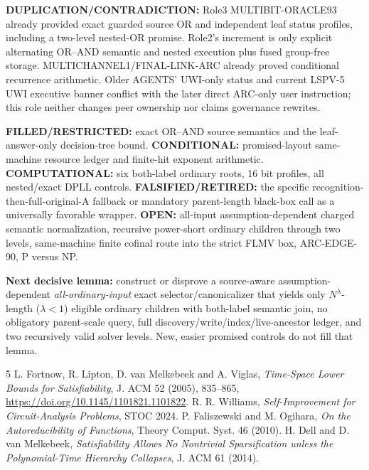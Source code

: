 \documentclass[11pt]{article}
\begin{document}
\textbf{DUPLICATION/CONTRADICTION:} Role3 MULTIBIT-ORACLE93 already provided exact guarded source OR and independent leaf status profiles, including a two-level nested-OR promise. Role2's increment is only explicit alternating OR--AND semantic and nested execution plus fused group-free storage. MULTICHANNEL1/FINAL-LINK-ARC already proved conditional recurrence arithmetic. Older AGENTS' UWI-only status and current LSPV-5 UWI executive banner conflict with the later direct ARC-only user instruction; this role neither changes peer ownership nor claims governance rewrites.

\textbf{FILLED/RESTRICTED:} exact OR--AND source semantics and the leaf-answer-only decision-tree bound. \textbf{CONDITIONAL:} promised-layout same-machine resource ledger and finite-hit exponent arithmetic. \textbf{COMPUTATIONAL:} six both-label ordinary roots, 16 bit profiles, all nested/exact DPLL controls. \textbf{FALSIFIED/RETIRED:} the specific recognition-then-full-original-A fallback or mandatory parent-length black-box call as a universally favorable wrapper. \textbf{OPEN:} all-input assumption-dependent charged semantic normalization, recursive power-short ordinary children through two levels, same-machine finite cofinal route into the strict FLMV box, ARC-EDGE-90, P versus NP.

\textbf{Next decisive lemma:} construct or disprove a source-aware assumption-dependent \emph{all-ordinary-input} exact selector/canonicalizer that yields only $N^\lambda$-length ($\lambda<1$) eligible ordinary children with both-label semantic join, no obligatory parent-scale query, full discovery/write/index/live-ancestor ledger, and two recursively valid solver levels. New, easier promised controls do not fill that lemma.

\begin{thebibliography}{5}
 L. Fortnow, R. Lipton, D. van Melkebeek and A. Viglas, \emph{Time-Space Lower Bounds for Satisfiability}, J. ACM 52 (2005), 835--865, \url{https://doi.org/10.1145/1101821.1101822}.
 R. R. Williams, \emph{Self-Improvement for Circuit-Analysis Problems}, STOC 2024.
 P. Faliszewski and M. Ogihara, \emph{On the Autoreducibility of Functions}, Theory Comput. Syst. 46 (2010).
 H. Dell and D. van Melkebeek, \emph{Satisfiability Allows No Nontrivial Sparsification unless the Polynomial-Time Hierarchy Collapses}, J. ACM 61 (2014).
\end{thebibliography}
\end{document}
